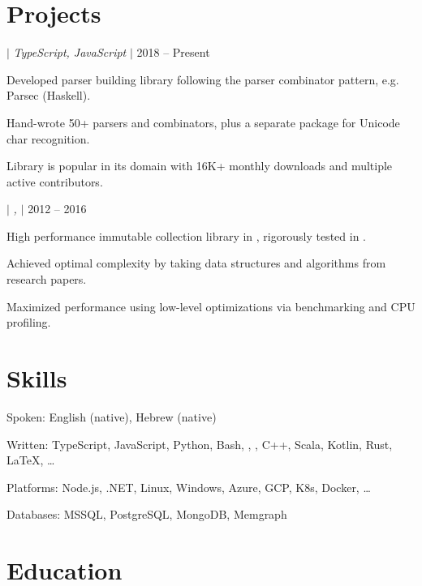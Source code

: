 \documentclass[a4paper,11pt]{article}
\begin{document}
\section{Projects}
\begin{sectionList}%
    \begin{project}{\textbf{\parjs} $|$ \emph{TypeScript, JavaScript} $|$ }{2018 -- Present}
        \item Developed parser building library following the parser combinator pattern, e.g. Parsec (Haskell).
        \item Hand-wrote 50+ parsers and combinators, plus a separate package for Unicode char recognition.
        \item Library is popular in its domain with 16K+ monthly downloads and multiple active contributors.
    \end{project}
    \begin{project}{\textbf{\imms} $|$ \emph{, } $|$ }{2012 -- 2016}
        \item High performance immutable collection library in , rigorously tested in .
        \item Achieved optimal complexity by taking data structures and algorithms from research papers.
        \item Maximized performance using low-level optimizations via benchmarking and CPU profiling.
    \end{project}
\end{sectionList}%

\section{Skills}
\begin{skillList}
    \item[Spoken:] English (native), Hebrew (native)
    \item[Written:] TypeScript, JavaScript, Python, Bash, , , C++, Scala, Kotlin, Rust, \LaTeX, \dots
    \item[Platforms:] Node.js, .NET, Linux, Windows, Azure, GCP, K8s, Docker, \dots
    \item[Databases:] MSSQL, PostgreSQL, MongoDB, Memgraph
\end{skillList}

\section{Education}
\begin{sectionList}%
\end{sectionList}

\end{document}
